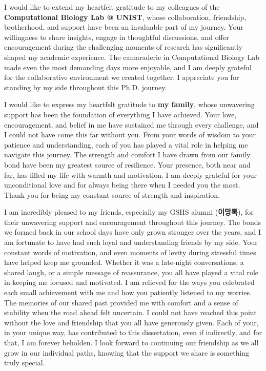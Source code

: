 \documentclass[11pt, a4paper, onecolumn, oneside]{report}
\begin{document}
        I would like to extend my heartfelt gratitude to my colleagues of the \textbf{Computational Biology Lab @ UNIST}, whose collaboration, friendship, brotherhood, and support have been an invaluable part of my journey. Your willingness to share insights, engage in thoughtful discussions, and offer encouragement during the challenging moments of research has significantly shaped my academic experience. The camaraderie in Computational Biology Lab made even the most demanding days more enjoyable, and I am deeply grateful for the collaborative environment we created together. I appreciate you for standing by my side throughout this Ph.D. journey.

        I would like to express my heartfelt gratitude to \textbf{my family}, whose unwavering support has been the foundation of everything I have achieved. Your love, encouragement, and belief in me have sustained me through every challenge, and I could not have come this far without you. From your words of wisdom to your patience and understanding, each of you has played a vital role in helping me navigate this journey. The strength and comfort I have drawn from our family bond have been my greatest source of resilience. Your presence, both near and far, has filled my life with warmth and motivation. I am deeply grateful for your unconditional love and for always being there when I needed you the most. Thank you for being my constant source of strength and inspiration.

        I am incredibly pleased to my friends, especially my GSHS alumni (\textbf{이망톡}), for their unwavering support and encouragement throughout this journey. The bonds we formed back in our school days have only grown stronger over the years, and I am fortunate to have had such loyal and understanding friends by my side. Your constant words of motivation, and even moments of levity during stressful times have helped keep me grounded. Whether it was a late-night conversations, a shared laugh, or a simple message of reassurance, you all have played a vital role in keeping me focused and motivated. I am relieved for the ways you celebrated each small achievement with me and how you patiently listened to my worries. The memories of our shared past provided me with comfort and a sense of stability when the road ahead felt uncertain. I could not have reached this point without the love and friendship that you all have generously given. Each of your, in your unique way, has contributed to this dissertation, even if indirectly, and for that, I am forever beholden. I look forward to continuing our friendship as we all grow in our individual paths, knowing that the support we share is something truly special.
\end{document}
